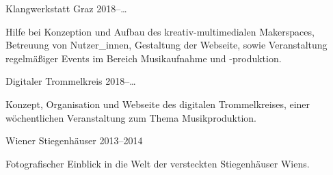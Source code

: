 %
%

\begin{projects}
	\project
	{Klangwerkstatt Graz}
	{2018–…}
	{}
	{

		Hilfe bei Konzeption und Aufbau des kreativ-multimedialen Makerspaces,
		Betreuung von Nutzer\_innen, Gestaltung der Webseite, sowie
		Veranstaltung regelmäßiger Events im Bereich Musikaufnahme und
		-produktion.
	}
	{}

	\project
	{Digitaler Trommelkreis}
	{2018–…}
	{}
	{

		Konzept, Organisation und Webseite des digitalen Trommelkreises, einer
		wöchentlichen Veranstaltung zum Thema Musikproduktion.
	}
	{}

	\project
	{Wiener Stiegenhäuser}
	{2013–2014}
	{}
	{

		Fotografischer Einblick in die Welt der versteckten Stiegenhäuser Wiens.
	}
	{}
\end{projects}
